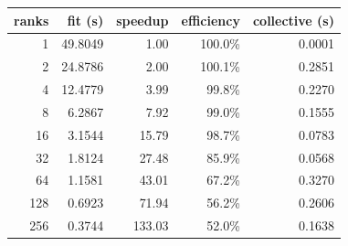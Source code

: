 \begin{tabular}{rrrrr}
\toprule
ranks & fit (s) & speedup & efficiency & collective (s)\\
\midrule
1 & 49.8049 & 1.00 & 100.0\% & 0.0001\\
2 & 24.8786 & 2.00 & 100.1\% & 0.2851\\
4 & 12.4779 & 3.99 & 99.8\% & 0.2270\\
8 & 6.2867 & 7.92 & 99.0\% & 0.1555\\
16 & 3.1544 & 15.79 & 98.7\% & 0.0783\\
32 & 1.8124 & 27.48 & 85.9\% & 0.0568\\
64 & 1.1581 & 43.01 & 67.2\% & 0.3270\\
128 & 0.6923 & 71.94 & 56.2\% & 0.2606\\
256 & 0.3744 & 133.03 & 52.0\% & 0.1638\\
\bottomrule
\end{tabular}
